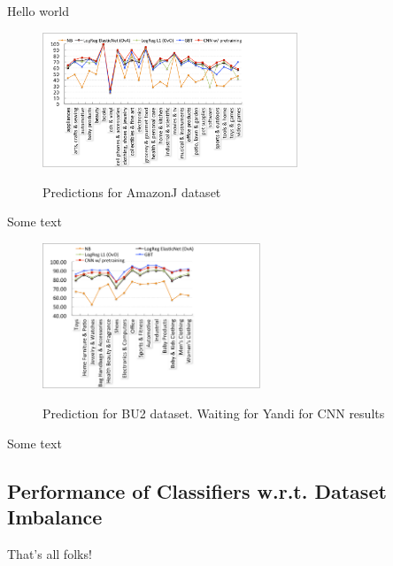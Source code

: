 \vspace{-0.2cm}

Hello world



\begin{figure}
\centering
\includegraphics[width=0.68\textwidth]{images/amazonj-WUC-predictions}
\label{Figure_amazonj-WUC-predictions}
\caption{Predictions for AmazonJ dataset}
\end{figure}
Some text

\begin{figure}
\centering
\includegraphics[width=0.58\textwidth]{images/BU2-WUC-predictions}
\label{Figure_BU2-WUC-predictions}
\caption{Prediction for BU2 dataset. Waiting for Yandi for CNN results}
\end{figure}
Some text

\subsection{Performance of Classifiers w.r.t. Dataset Imbalance}
\label{Subsect:results>imbalance-performance-expectations}

That's all folks!
